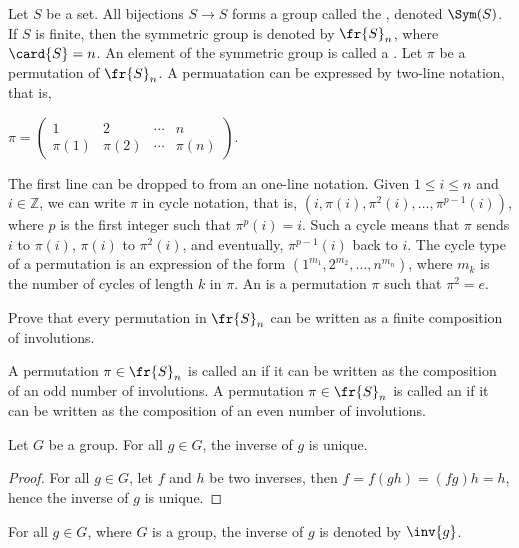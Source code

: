 \documentclass[10pt]{article}
\begin{document}
\begin{example}
    Let $S$ be a set. All bijections $S\to S$ forms a group called the , denoted $\Sym(S)$. If $S$ is finite, then the symmetric group is denoted by ${\fr{S}}_{n}$, where $\card{S}=n$. An element of the symmetric group is called a . Let $\pi$ be a permutation of ${\fr{S}}_{n}$. A permuatation can be expressed by two-line notation, that is, 
    \begin{center}
        $\pi=
        \begin{pmatrix}
            1 & 2 & \cdots & n \\
            \pi(1) & \pi(2) & \cdots & \pi(n)
        \end{pmatrix}$.
    \end{center}
    The first line can be dropped to from an one-line notation. Given $1\le i\le n$ and $i\in\mathbb{Z}$, we can write $\pi$ in cycle notation, that is, $(i,\pi(i),{\pi}^{2}(i),\ldots,{\pi}^{p-1}(i))$, where $p$ is the first integer such that ${\pi}^{p}(i)=i$. Such a cycle means that $\pi$ sends $i$ to $\pi(i)$, $\pi(i)$ to ${\pi}^{2}(i)$, and eventually, ${\pi}^{p-1}(i)$ back to $i$. The cycle type of a permutation is an expression of the form $({1}^{{m}_{1}},{2}^{{m}_{2}},\ldots,{n}^{{m}_{n}})$, where ${m}_{k}$ is the number of cycles of length $k$ in $\pi$. An  is a permutation $\pi$ such that ${\pi}^{2}=e$.
\end{example}
\begin{problem}
    Prove that every permutation in ${\fr{S}}_{n}$ can be written as a finite composition of involutions.
\end{problem}
\begin{definition}
    A permutation $\pi\in{\fr{S}}_{n}$ is called an  if it can be written as the composition of an odd number of involutions. A permutation $\pi\in{\fr{S}}_{n}$ is called an  if it can be written as the composition of an even number of involutions.
\end{definition}
\begin{proposition}
    Let $G$ be a group. For all $g\in G$, the inverse of $g$ is unique.
\end{proposition}
\begin{proof}
    For all $g\in G$, let $f$ and $h$ be two inverses, then $f=f(gh)=(fg)h=h$, hence the inverse of $g$ is unique.
\end{proof}
\par
For all $g\in G$, where $G$ is a group, the inverse of $g$ is denoted by $\inv{g}$.
\end{document}
